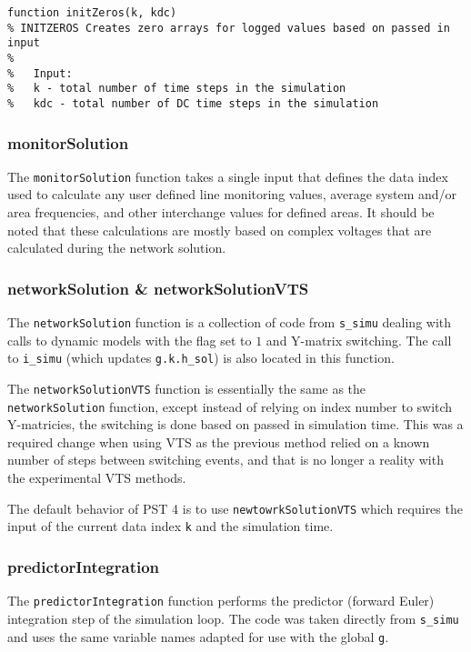 \begin{verbatim}
function initZeros(k, kdc)
% INITZEROS Creates zero arrays for logged values based on passed in input
%
%   Input:
%   k - total number of time steps in the simulation
%   kdc - total number of DC time steps in the simulation
\end{verbatim}

\subsubsection{monitorSolution}  
The \verb|monitorSolution| function takes a single input that defines the data index used to calculate any user defined line monitoring values, average system and/or area frequencies, and other interchange values for defined areas.
It should be noted that these calculations are mostly based on complex voltages that are calculated during the network solution.

\subsubsection{networkSolution \& networkSolutionVTS}  
The \verb|networkSolution| function is a collection of code from \verb|s_simu| dealing with calls to dynamic models with the flag set to $1$ and Y-matrix switching.
The call to \verb|i_simu| (which updates \verb|g.k.h_sol|) is also located in this function.

The \verb|networkSolutionVTS| function is essentially the same as the \verb|networkSolution| function, except instead of relying on index number to switch Y-matricies, the switching is done based on passed in simulation time.
This was a required change when using VTS as the previous method relied on a known number of steps between switching events, and that is no longer a reality with the experimental VTS methods.

The default behavior of PST 4 is to use \verb|newtowrkSolutionVTS| which requires the input of the current data index \verb|k| and the simulation time.

\subsubsection{predictorIntegration}  
The \verb|predictorIntegration| function performs the predictor (forward Euler) integration step of the simulation loop.
The code was taken directly from \verb|s_simu| and uses the same variable names adapted for use with the global \verb|g|.

